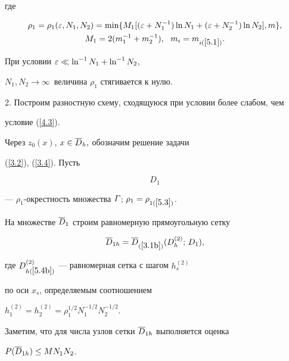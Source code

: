 где


\begin{gather} \label{5.3}


\rho_1=\rho_1(\eps,N_1,N_2)=\min\{ M_1[


(\eps+N_1^{-1})\ln N_1+


(\eps+N_2^{-1})\ln N_2], m\}, \\


M_1=2(m_1^{-1}+m_2^{-1}),\ \


m_i=m_{i(\ref{5.1})}. \notag


\end{gather}


При условии $\varepsilon\ll \ln^{-1} N_1+\ln^{-1} N_2$, 


$N_1, N_2\to\infty\,$ величина $\rho_1$ стягивается к нулю.





2. Построим разностную схему, сходящуюся при условии более слабом, чем


условие (\ref{4.3}).


Через $z_0(x)$, $x\in\overline{D}_h,$ обозначим решение задачи


(\ref{3.2}), (\ref{3.4}). Пусть


\beqs \label{5.4}


\begin{equation} \label{5.4a}


D_1 


\end{equation}


--- $\rho_1$-окрестность множества $\varGamma$; $\rho_1=\rho_{1(\ref{5.3})}$.


На множестве $\overline{D}_1$ строим равномерную прямоугольную сетку


\begin{equation} \label{5.4b}


\Db_{1h}=\Db_{(\ref{3.1b})}(D_h^{(2)};\, D_1),


\end{equation}


где $D_{h(\ref{5.4b})}^{(2)}$ --- равномерная сетка с шагом $h_s^{(2)}$


по оси $x_s$, определяемым соотношением 


$h_1^{(2)}=h_2^{(2)}=\rho_1^{1/2} N_1^{-1/2} N_2^{-1/2}$. 


Заметим, что для числа узлов сетки $\overline{D}_{1h}$ выполняется оценка


$P(\overline{D}_{1h})\le MN_1N_2$.





